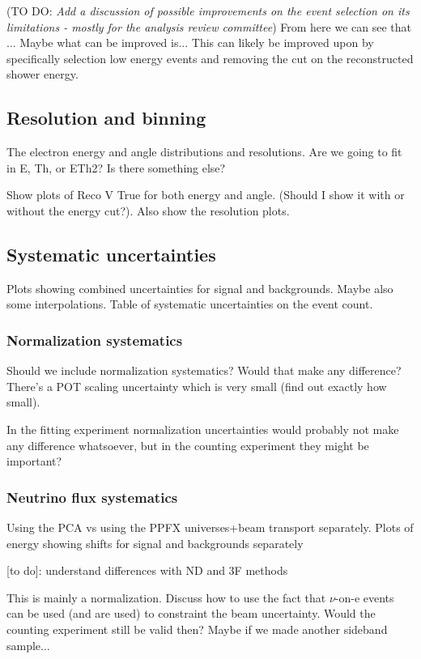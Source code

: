 \documentclass[12pt]{article}
\newcommand{\todo }[1]{({\color{red}\sc TO DO: \textit{#1}})}
\begin{document}
\todo{Add a discussion of possible improvements on the event selection on its limitations - mostly for the analysis review committee}
From here we can see that ... Maybe what can be improved is...
This can likely be improved upon by specifically selection low energy events and removing the cut on the reconstructed shower energy. 

\subsection{Resolution and binning}
The electron energy and angle distributions and resolutions. Are we going to fit in E, Th, or ETh2? Is there something else?

Show plots of Reco V True for both energy and angle. (Should I show it with or without the energy cut?). Also show the resolution plots.

\subsection{Systematic uncertainties}
Plots showing combined uncertainties for signal and backgrounds. Maybe also some interpolations. Table of systematic uncertainties on the event count.

\subsubsection*{Normalization systematics}
Should we include normalization systematics? Would that make any difference? There's a POT scaling uncertainty which is very small (find out exactly how small).

In the fitting experiment normalization uncertainties would probably not make any difference whatsoever, but in the counting experiment they might be important?

\subsubsection*{Neutrino flux systematics}
Using the PCA vs using the PPFX universes+beam transport separately. Plots of energy showing shifts for signal and backgrounds separately

[to do]: understand differences with ND and 3F methods

This is mainly a normalization. Discuss how to use the fact that $\nu$-on-e events can be used (and are used) to constraint the beam uncertainty. Would the counting experiment still be valid then? Maybe if we made another sideband sample...
\end{document}
